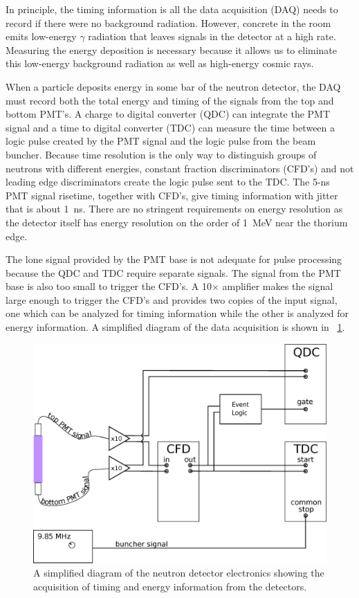 In principle, the timing information is all the data acquisition (DAQ) needs to record if there were no background radiation.  However, concrete in the room emits low-energy $\gamma$ radiation that leaves signals in the detector at a high rate.  Measuring the energy deposition is necessary because it allows us to eliminate this low-energy background radiation as well as high-energy cosmic rays.

When a particle deposits energy in some bar of the neutron detector, the DAQ must record both the total energy and timing of the signals from the top and bottom PMT's.  A charge to digital converter (QDC) can integrate the PMT signal and a time to digital converter (TDC) can measure the time between a logic pulse created by the PMT signal and the logic pulse from the beam buncher.  Because time resolution is the only way to distinguish groups of neutrons with different energies, constant fraction discriminators (CFD's) and not leading edge discriminators create the logic pulse sent to the TDC.  The 5-ns PMT signal risetime, together with CFD's, give timing information with jitter that is about 1~ns.  There are no stringent requirements on energy resolution as the detector itself has energy resolution on the order of 1~MeV near the thorium edge.

The lone signal provided by the PMT base is not adequate for pulse processing because the QDC and TDC require separate signals.  The signal from the PMT base is also too small to trigger the CFD's.  A 10$\times$ amplifier makes the signal large enough to trigger the CFD's and provides two copies of the input signal, one which can be analyzed for timing information while the other is analyzed for energy information.  A simplified diagram of the data acquisition is shown in {\fig}~\ref{fig:simpleElectronics}.

\begin{figure}[htp]
\centering
\includegraphics[width=1.0\textwidth]{figures/basic_electronics.eps}
\caption{A simplified diagram of the neutron detector electronics showing the acquisition of timing and energy information from the detectors.}
\label{fig:simpleElectronics}
\end{figure}

